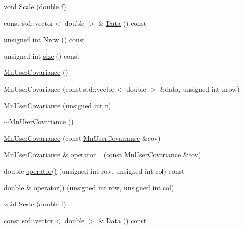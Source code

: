 \begin{DoxyCompactItemize}
void \mbox{\hyperlink{classROOT_1_1Minuit2_1_1MnUserCovariance_ab94f947af8cd0dbff661baa69b429ae3}{Scale}} (double f)
\item 
const std\+::vector$<$ double $>$ \& \mbox{\hyperlink{classROOT_1_1Minuit2_1_1MnUserCovariance_a796819e63a5a1a80373a7be0cd764f2e}{Data}} () const
\item 
unsigned int \mbox{\hyperlink{classROOT_1_1Minuit2_1_1MnUserCovariance_a10adc07ae961afea4de48183aa68f6fc}{Nrow}} () const
\item 
unsigned int \mbox{\hyperlink{classROOT_1_1Minuit2_1_1MnUserCovariance_ab15b9a83170c4e1bda1c22634fe020f5}{size}} () const
\item 
\mbox{\hyperlink{classROOT_1_1Minuit2_1_1MnUserCovariance_a40b83657c20ed7612fd58971145e2150}{Mn\+User\+Covariance}} ()
\item 
\mbox{\hyperlink{classROOT_1_1Minuit2_1_1MnUserCovariance_aeb4bbc60170bc2b4694b9064b4f6761c}{Mn\+User\+Covariance}} (const std\+::vector$<$ double $>$ \&data, unsigned int nrow)
\item 
\mbox{\hyperlink{classROOT_1_1Minuit2_1_1MnUserCovariance_a595fae416d6ebce671a3aac8320ac0e4}{Mn\+User\+Covariance}} (unsigned int n)
\item 
\mbox{\hyperlink{classROOT_1_1Minuit2_1_1MnUserCovariance_ae26c8658a5a5e7fbf16a4fe7e63740ee}{$\sim$\+Mn\+User\+Covariance}} ()
\item 
\mbox{\hyperlink{classROOT_1_1Minuit2_1_1MnUserCovariance_a5f815aae41551b49080ce32c11a5a865}{Mn\+User\+Covariance}} (const \mbox{\hyperlink{classROOT_1_1Minuit2_1_1MnUserCovariance}{Mn\+User\+Covariance}} \&cov)
\item 
\mbox{\hyperlink{classROOT_1_1Minuit2_1_1MnUserCovariance}{Mn\+User\+Covariance}} \& \mbox{\hyperlink{classROOT_1_1Minuit2_1_1MnUserCovariance_a404884fb8452152d56ff18f83e277960}{operator=}} (const \mbox{\hyperlink{classROOT_1_1Minuit2_1_1MnUserCovariance}{Mn\+User\+Covariance}} \&cov)
\item 
double \mbox{\hyperlink{classROOT_1_1Minuit2_1_1MnUserCovariance_abc3ebb8eb0d31cb2cdf38fb16a4d8224}{operator()}} (unsigned int row, unsigned int col) const
\item 
double \& \mbox{\hyperlink{classROOT_1_1Minuit2_1_1MnUserCovariance_af63a82e8fc0c72cdb46fe670da78ffce}{operator()}} (unsigned int row, unsigned int col)
\item 
void \mbox{\hyperlink{classROOT_1_1Minuit2_1_1MnUserCovariance_ab94f947af8cd0dbff661baa69b429ae3}{Scale}} (double f)
\item 
const std\+::vector$<$ double $>$ \& \mbox{\hyperlink{classROOT_1_1Minuit2_1_1MnUserCovariance_a796819e63a5a1a80373a7be0cd764f2e}{Data}} () const

\end{DoxyCompactItemize}
